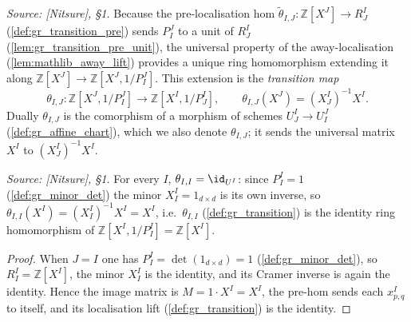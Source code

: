 \begin{definition}

  \label{def:gr_transition}
  \textit{Source: [Nitsure], \S 1.}
  Because the pre-localisation hom \(\tilde\theta_{I,J} : \mathbb{Z}[X^J] \to
  R^I_J\) (\cref{def:gr_transition_pre}) sends \(P^J_I\) to a unit of \(R^I_J\)
  (\cref{lem:gr_transition_pre_unit}), the universal property of the
  away-localisation (\cref{lem:mathlib_away_lift}) provides a unique ring
  homomorphism extending it along \(\mathbb{Z}[X^J] \to \mathbb{Z}[X^J, 1/P^J_I]\).
  This extension is the \emph{transition map}
  \[
    \theta_{I,J} : \mathbb{Z}[X^J, 1/P^J_I] \longrightarrow
    \mathbb{Z}[X^I, 1/P^I_J], \qquad \theta_{I,J}(X^J) = (X^I_J)^{-1} X^I .
  \]
  Dually \(\theta_{I,J}\) is the comorphism of a morphism of schemes
  \(U^I_J \to U^J_I\) (\cref{def:gr_affine_chart}), which we also denote
  \(\theta_{I,J}\); it sends the universal matrix \(X^I\) to \((X^I_J)^{-1} X^I\).
\end{definition}

\begin{lemma}

  \label{lem:gr_transition_self}
  \textit{Source: [Nitsure], \S 1.}
  For every \(I\), \(\theta_{I,I} = \id_{U^I}\): since \(P^I_I = 1\)
  (\cref{def:gr_minor_det}) the minor \(X^I_I = 1_{d\times d}\) is its own
  inverse, so \(\theta_{I,I}(X^I) = (X^I_I)^{-1} X^I = X^I\), i.e.\
  \(\theta_{I,I}\) (\cref{def:gr_transition}) is the identity ring homomorphism
  of \(\mathbb{Z}[X^I, 1/P^I_I] = \mathbb{Z}[X^I]\).
\end{lemma}
\begin{proof}
  \leanok
  When \(J = I\) one has \(P^I_I = \det(1_{d\times d}) = 1\)
  (\cref{def:gr_minor_det}), so \(R^I_I = \mathbb{Z}[X^I]\), the minor \(X^I_I\)
  is the identity, and its Cramer inverse is again the identity. Hence the image
  matrix is \(M = 1 \cdot X^I = X^I\), the pre-hom sends each \(x^I_{p,q}\) to
  itself, and its localisation lift (\cref{def:gr_transition}) is the identity.
\end{proof}


